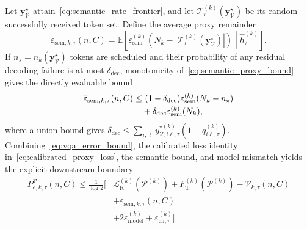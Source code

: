 \documentclass[journal]{IEEEtran}
\begin{document}
Let $\bm y_{\mathcal V}^{\star}$ attain~\eqref{eq:semantic_rate_frontier}, and let $\mathcal T_{\tau}^{(k)}(\bm y_{\mathcal V}^{\star})$ be its random successfully received token set. Define the average proxy remainder
\begin{equation}
\overline\varepsilon_{\mathrm{sem},k,\tau}(n,C)
=\mathbb E\!\left[
\varepsilon_{\mathrm{sem}}^{(k)}
\!\left(N_k-|\mathcal T_{\tau}^{(k)}(\bm y_{\mathcal V}^{\star})|\right)
\middle|\widehat h_{\tau}^{(k)}\right].
\label{eq:average_semantic_remainder}
\end{equation}
If $n_{\star}=n_k(\bm y_{\mathcal V}^{\star})$ tokens are scheduled and their probability of any residual decoding failure is at most $\delta_{\mathrm{dec}}$, monotonicity of~\eqref{eq:semantic_proxy_bound} gives the directly evaluable bound
\begin{align}
\overline\varepsilon_{\mathrm{sem},k,\tau}(n,C)
\leq&~(1-\delta_{\mathrm{dec}})
\varepsilon_{\mathrm{sem}}^{(k)}(N_k-n_{\star})
\notag\\[-0.2em]
&+\delta_{\mathrm{dec}}\varepsilon_{\mathrm{sem}}^{(k)}(N_k),
\label{eq:average_semantic_remainder_bound}
\end{align}
where a union bound gives $\delta_{\mathrm{dec}}\leq\sum_{i,\ell}y_{\mathcal V,i\ell,\tau}^{\star(k)}(1-q_{i\ell,\tau}^{(k)})$. Combining~\eqref{eq:vqa_error_bound}, the calibrated loss identity in~\eqref{eq:calibrated_proxy_loss}, the semantic bound, and model mismatch yields the explicit downstream boundary
\begin{equation}
\begin{split}
P_{e,k,\tau}^{\mathcal V}(n,C)
\leq\frac{1}{\log 2}\big[&\mathcal L_{\mathrm R}^{(k)}(\mathcal P^{(k)})
+F_{\mathrm T}^{(k)}(\mathcal P^{(k)})
-\mathcal V_{k,\tau}(n,C)\\
&+\overline\varepsilon_{\mathrm{sem},k,\tau}(n,C)\\
&+2\varepsilon_{\mathrm{model}}^{(k)}
+\varepsilon_{\mathrm{ch},\tau}^{(k)}\big].
\end{split}
\label{eq:rate_retention_vqa_boundary}
\end{equation}
\end{document}
